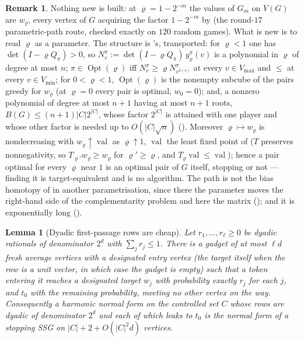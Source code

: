 \documentclass[11pt]{article}
\theoremstyle{plain}
\newtheorem{lemma}[theorem]{Lemma}
\theoremstyle{definition}
\newtheorem{remark}[theorem]{Remark}
\DeclareMathOperator{\val}{val}
\DeclareMathOperator{\Opt}{Opt}
\newcommand{\Vmax}{V_{\max}}
\newcommand{\Vmin}{V_{\min}}
\begin{document}
\begin{remark}\label{rem:discount-path}
Nothing new is built: at $\varrho=1-2^{-m}$ the values of $G_m$ on $V(G)$
are $w_{\varrho}$, every vertex of $G$ acquiring the factor $1-2^{-m}$ by
 (the round-$17$ parametric-path route, checked exactly on
$120$ random games). What is new is to read $\varrho$ as a parameter. The
structure is 's, transported: for $\varrho<1$ one has
$\det(I-\varrho Q_\pi)>0$, so
$N^{\pi}_v:=\det(I-\varrho Q_\pi)\,y^{\pi}_{\varrho}(v)$ is a polynomial in
$\varrho$ of degree at most $n$; $\pi\in\Opt(\varrho)$ iff
$N^{\pi}_v\ge\varrho N^{\pi}_{v^{\bar\pi(v)}}$ at every $v\in\Vmax$ and
$\le$ at every $v\in\Vmin$; for $0<\varrho<1$, $\Opt(\varrho)$ is the
nonempty subcube of the pairs greedy for $w_{\varrho}$ (at $\varrho=0$ every
pair is optimal, $w_0=0$); and, a nonzero polynomial of degree at most
$n+1$ having at most $n+1$ roots, $B(G)\le(n+1)|C|2^{|C|}$, whose factor
$2^{|C|}$ is attained with one player and whose other factor is needed up
to $O(|C|\sqrt n)$ (). Moreover $\varrho\mapsto w_{\varrho}$ is nondecreasing
with $w_{\varrho}\uparrow\val$ as $\varrho\uparrow1$, $\val$ the least fixed
point of  ($T$ preserves nonnegativity, so
$T_{\varrho'}w_{\varrho}\ge w_{\varrho}$ for $\varrho'\ge\varrho$, and
$T_{\varrho}\val\le\val$); hence a pair optimal for every $\varrho$ near $1$
is an optimal pair of $G$ itself, stopping or not --- finding it is
target-equivalent and is no algorithm. The path is not the bias homotopy of
 in another parametrisation, since there the parameter moves
the right-hand side of the complementarity problem and here the matrix
(); and it is exponentially long
().
\end{remark}

\begin{lemma}[Dyadic first-passage rows are cheap]\label{lem:dyadic-row}
Let $r_1,\dots,r_\ell\ge0$ be dyadic rationals of denominator $2^{d}$ with
$\sum_jr_j\le1$. There is a gadget of at most $\ell d$ fresh average
vertices with a designated entry vertex (the target itself when the row
is a unit vector, in which case the gadget is empty) such that a token entering it
reaches a designated target $w_j$ with probability exactly $r_j$ for each
$j$, and $t_0$ with the remaining probability, meeting no other vertex on
the way. Consequently a harmonic normal form on the controlled set $C$
whose rows are dyadic of denominator $2^{d}$ and each of which leaks to
$t_0$ is the normal form of a stopping SSG on $|C|+2+O(|C|^{2}d)$
vertices.
\end{lemma}
\end{document}
